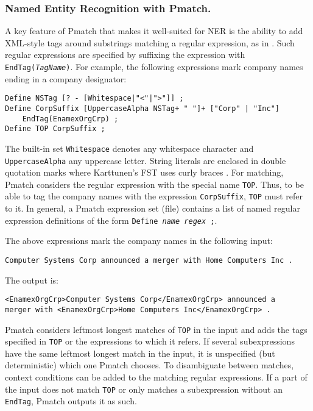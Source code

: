 \documentclass{llncs}
\begin{document}
\subsubsection{Named Entity Recognition with Pmatch.}
\label{pmatch_for_ner}

A key feature of Pmatch that makes it well-suited for NER is the ability
to add XML-style tags around substrings matching a regular expression,
as in \cite{karttunen/2011}. Such regular expressions are
specified by suffixing the expression with
\texttt{EndTag(\textit{TagName})}. For example, the following
expressions mark company names ending in a company designator:

\begin{verbatim}
Define NSTag [? - [Whitespace|"<"|">"]] ;
Define CorpSuffix [UppercaseAlpha NSTag+ " "]+ ["Corp" | "Inc"]
    EndTag(EnamexOrgCrp) ;
Define TOP CorpSuffix ;
\end{verbatim}

\begin{sloppypar}
\noindent
The built-in set \texttt{Whitespace} denotes any whitespace character
and \texttt{UppercaseAlpha} any uppercase letter. String literals are
enclosed in double quotation marks where Karttunen's FST uses curly braces
\cite{karttunen/2011}.
For matching, Pmatch considers the regular expression with the special
name \texttt{TOP}. Thus, to be able to tag the company names with the
expression \texttt{CorpSuffix}, \texttt{TOP} must refer to it.
In general, a Pmatch expression set (file) contains a list of named
regular expression definitions of the form \texttt{Define
  \textit{name} \textit{regex} ;}.
\end{sloppypar}

The above expressions mark the company names in the following input:
\begin{verbatim}
Computer Systems Corp announced a merger with Home Computers Inc .
\end{verbatim}
\noindent
The output is:
\begin{verbatim}
<EnamexOrgCrp>Computer Systems Corp</EnamexOrgCrp> announced a
merger with <EnamexOrgCrp>Home Computers Inc</EnamexOrgCrp> .
\end{verbatim}

Pmatch considers leftmost longest matches of \texttt{TOP} in the input
and adds the tags specified in \texttt{TOP} or the expressions to
which it refers. If several subexpressions have the same leftmost
longest match in the input, it is unspecified (but deterministic)
which one Pmatch
chooses. To disambiguate between matches, context conditions can be
added to the matching regular expressions.
If a part of the input does not match \texttt{TOP} or only matches a
subexpression without an \texttt{EndTag},
Pmatch outputs it as such.
\end{document}
